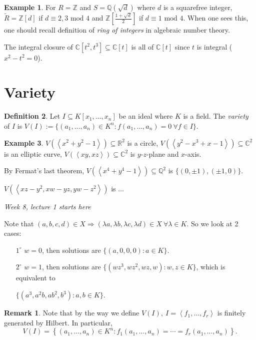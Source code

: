\documentclass[a4paper]{article}
\newcommand{\la}{\left\langle}
\newcommand{\ra}{\right\rangle}
\newcommand{\Z}{\mathbb Z}
\newcommand{\Q}{\mathbb Q}
\newcommand{\C}{\mathbb C}
\newcommand{\Mod}{\text{ mod }}
\theoremstyle{definition}
\newtheorem{defn}{Definition}[subsection]
\newtheorem{example}[defn]{Example}
\newtheorem*{remark}{Remark}
\begin{document}
\begin{example}
For $R=\Z$ and $S=\Q\left(\sqrt d\right)$ where $d$ is a squarefree integer, $\widetilde R=\Z[d]$ if $d\equiv 2,3\Mod 4$ and $\Z\left[\frac{1+\sqrt d}{2}\right]$ if $d\equiv 1\Mod 4$. When one sees this, one should recall definition of \textit{ring of integers} in algebraic number theory.

The integral closure of $\C[t^2,t^3]\subseteq \C[t]$ is all of $\C[t]$ since $t$ is integral ($x^2-t^2=0$).
\end{example}

\section{Variety}
\begin{defn}
Let $I\subseteq K[x_1,\ldots,x_n]$ be an ideal where $K$ is a field. The \textit{variety} of $I$ is $V(I):=\{(a_1,\ldots,a_n)\in K^n:f(a_1,\ldots,a_n)=0 \ \forall f\in I\}$.
\end{defn}

\begin{example}
$V(\la x^2+y^2-1 \ra)\subseteq \mathbb R^2$ is a circle, $V(\la y^2-x^3+x-1 \ra)\subseteq \C^2$ is an elliptic curve,  $V(\la xy,xz \ra)\subseteq \C^2$ is $y$-$z$-plane and $x$-axis. 

By Fermat's last theorem, $V(\la x^4+y^4-1\ra)\subseteq \Q^2$ is $\{(0,\pm1),(\pm1,0)\}$.

$V(\la xz-y^2,xw-yz,yw-z^2 \ra)$ is ...
\end{example}

\begin{flushright}
\textit{Week 8, lecture 1 starts here}
\end{flushright}

Note that $(a,b,c,d)\in X\Rightarrow (\lambda a,\lambda b,\lambda c,\lambda d)\in X \ \forall \lambda\in K$. So we look at 2 cases:
\begin{enumerate}
\item[$1^\circ$] $w=0$, then solutions are $\{(a,0,0,0):a\in K\}$.
\item[$2^\circ$] $w=1$, then solutions are $\{(wz^3,wz^2,wz,w):w,z\in K\}$, which is equivalent to

$\{(a^3,a^2b,ab^2,b^3):a,b\in K\}$.
\end{enumerate}

\begin{remark}
Note that by the way we define $V(I),\ I=\la f_1,\ldots,f_r\ra$ is finitely generated by Hilbert. In particular,
\[
V(I)=\left\{ (a_1,\ldots,a_n)\in K^n:f_1(a_1,\ldots,a_n)=\cdots=f_r(a_1,\ldots,a_n) \right\}.
\] 
\end{remark}
\end{document}
